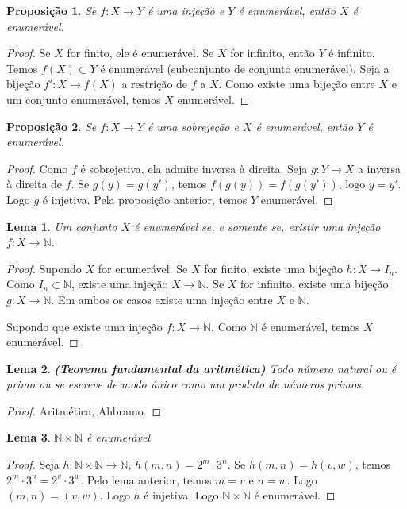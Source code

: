 \documentclass{article}
\theoremstyle{plain}
\newtheorem{prop}{Proposição}[section]
\newtheorem{lema}{Lema}
\theoremstyle{definition}
\theoremstyle{remark}
\begin{document}
\begin{prop}
	Se $f:X\to Y$ é uma injeção e $Y$ é enumerável, então $X$ é enumerável.
\end{prop}
\begin{proof}
	Se $X$ for finito, ele é enumerável. Se $X$ for infinito,  então $Y$ é infinito. Temos $f(X) \subset Y$ é enumerável (subconjunto de conjunto enumerável). Seja  a bijeção $f':X\to f(X)$ a restrição de $f$ a $X$. Como existe uma bijeção entre $X$ e um conjunto enumerável, temos $X$ enumerável.
\end{proof}
\begin{prop}
	Se $f:X\to Y$ é uma sobrejeção e $X$ é enumerável, então $Y$ é enumerável.
\end{prop}
\begin{proof}
	Como $f$ é sobrejetiva, ela admite inversa à direita. Seja $g: Y\to X$ a inversa à direita de $f$.  Se $g(y) = g(y')$, temos $f(g(y)) = f(g(y'))$, logo $y = y'$. Logo $g$ é injetiva. Pela proposição anterior, temos $Y$ enumerável. 
\end{proof}
\begin{lema}
	Um conjunto $X$ é enumerável se, e somente se, existir uma injeção $f: X \to \mathbb{N}$.
\end{lema}
\begin{proof}
	Supondo $X$ for enumerável. Se $X$ for finito, existe uma bijeção $h: X \to I_n$. Como $I_n \subset \mathbb{N}$,  existe uma injeção $X\to \mathbb{N}$. Se $X$ for infinito, existe uma bijeção $g: X \to \mathbb{N}$. Em ambos os casos existe uma injeção entre $X$ e $\mathbb{N}$.

	Supondo que existe uma injeção $f: X \to \mathbb{N}$. Como $\mathbb{N}$ é enumerável, temos $X$ enumerável.
\end{proof}
\begin{lema}
	\textbf{(Teorema fundamental da aritmética)} Todo número natural ou é primo ou se escreve de modo único como um produto de números primos.
\end{lema}
\begin{proof}
	Aritmética, Ahbramo. %
\end{proof}
\begin{lema}
	$\mathbb{N} \times \mathbb{N}$ é enumerável
\end{lema}
\begin{proof}
	Seja $h:\mathbb{N} \times \mathbb{N} \to \mathbb{N}$, $ h(m,n) = 2^m\cdot 3^n$. Se $h(m,n) = h(v,w)$, temos $2^m\cdot 3^n = 2^v\cdot 3^w$. Pelo lema anterior, temos $m = v$ e $n = w$. Logo $(m,n) = (v,w)$. Logo $h$ é injetiva. Logo $\mathbb{N}\times \mathbb{N}$ é enumerável.
\end{proof}
\end{document}
